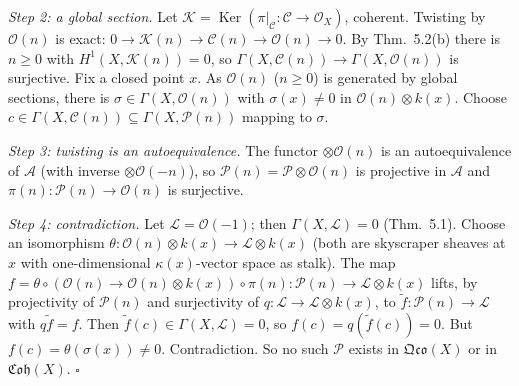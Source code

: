 \documentclass[11pt]{article}
\begin{document}
\emph{Step 2: a global section.} Let $\mathcal K=\operatorname{Ker}(\pi|_{\mathcal C}\colon\mathcal C\to\mathcal O_X)$, coherent. Twisting by $\mathcal O(n)$ is exact: $0\to\mathcal K(n)\to\mathcal C(n)\to\mathcal O(n)\to0$. By Thm.~5.2(b) there is $n\ge0$ with $H^1(X,\mathcal K(n))=0$, so $\Gamma(X,\mathcal C(n))\to\Gamma(X,\mathcal O(n))$ is surjective. Fix a closed point $x$. As $\mathcal O(n)$ ($n\ge0$) is generated by global sections, there is $\sigma\in\Gamma(X,\mathcal O(n))$ with $\sigma(x)\neq0$ in $\mathcal O(n)\otimes k(x)$. Choose $c\in\Gamma(X,\mathcal C(n))\subseteq\Gamma(X,\mathcal P(n))$ mapping to $\sigma$.

\emph{Step 3: twisting is an autoequivalence.} The functor $\otimes\mathcal O(n)$ is an autoequivalence of $\mathcal A$ (with inverse $\otimes\mathcal O(-n)$), so $\mathcal P(n)=\mathcal P\otimes\mathcal O(n)$ is projective in $\mathcal A$ and $\pi(n)\colon\mathcal P(n)\to\mathcal O(n)$ is surjective.

\emph{Step 4: contradiction.} Let $\mathcal L=\mathcal O(-1)$; then $\Gamma(X,\mathcal L)=0$ (Thm.~5.1). Choose an isomorphism $\theta\colon\mathcal O(n)\otimes k(x)\to\mathcal L\otimes k(x)$ (both are skyscraper sheaves at $x$ with one-dimensional $\kappa(x)$-vector space as stalk). The map $f=\theta\circ(\mathcal O(n)\to\mathcal O(n)\otimes k(x))\circ\pi(n)\colon\mathcal P(n)\to\mathcal L\otimes k(x)$ lifts, by projectivity of $\mathcal P(n)$ and surjectivity of $q\colon\mathcal L\to\mathcal L\otimes k(x)$, to $\tilde f\colon\mathcal P(n)\to\mathcal L$ with $q\tilde f=f$. Then $\tilde f(c)\in\Gamma(X,\mathcal L)=0$, so $f(c)=q(\tilde f(c))=0$. But $f(c)=\theta(\sigma(x))\neq0$. Contradiction. So no such $\mathcal P$ exists in $\mathfrak{Qco}(X)$ or in $\mathfrak{Coh}(X)$. \hfill$\square$
\end{document}
